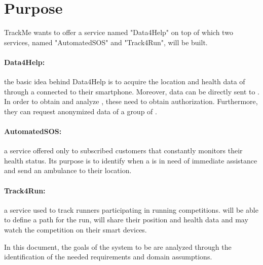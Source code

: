 \documentclass[../../rasd.tex]{subfiles}
\begin{document}
\section{Purpose\label{sect:1.1}}
			
			TrackMe wants to offer a service named "Data4Help" on top of which two services, named "AutomatedSOS" and "Track4Run", will be built.
			\paragraph{Data4Help:} the basic idea behind Data4Help is to acquire the location and health data of  through a  connected to their smartphone. Moreover, data can be directly sent to . In order to obtain and analyze , these need to obtain  authorization. Furthermore, they can request anonymized data of a group of .
			
			\paragraph{AutomatedSOS:} a service offered only to subscribed customers that constantly monitors their health status. Its purpose is to identify when a  is in need of immediate assistance and send an ambulance to their location.
			
			\paragraph{Track4Run:} a service used to track runners participating in running competitions.  will be able to define a path for the run,  will share their position and health data and  may watch the competition on their smart devices.

			In this document, the goals of the system to be are analyzed through the identification of the needed requirements and domain assumptions. 
\end{document}
